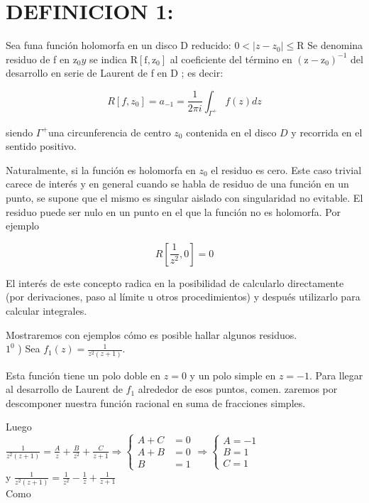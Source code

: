 \documentclass[10pt]{article}
\theoremstyle{plain}
\theoremstyle{definition}
\theoremstyle{remark}
\begin{document}
\section*{DEFINICION 1:}
Sea funa función holomorfa en un disco D reducido: $0<\left|z-z_{0}\right| \leqslant \mathrm{R}$ Se denomina residuo de f en $\mathrm{z}_0 y$ se indica $\mathrm{R}\left[\mathrm{f}, \mathrm{z}_0\right]$ al coeficiente del término en $\left(\mathrm{z}-\mathrm{z}_0\right)^{-1}$ del desarrollo en serie de Laurent de f en D ; es decir:


\begin{equation*}
R\left[f, z_{0}\right]=a_{-1}=\frac{1}{2 \pi i} \int_{\Gamma^{+}} f(z) d z \tag{20-1}
\end{equation*}


siendo $\Gamma^{+}$una circunferencia de centro $z_{0}$ contenida en el disco $D$ y recorrida en el sentido positivo.

Naturalmente, si la función es holomorfa en $z_{0}$ el residuo es cero. Este caso trivial carece de interés y en general cuando se habla de residuo de una función en un punto, se supone que el mismo es singular aislado con singularidad no evitable. El residuo puede ser nulo en un punto en el que la función no es holomorfa. Por ejemplo

$$
R\left[\frac{1}{z^{2}}, 0\right]=0
$$

El interés de este concepto radica en la posibilidad de calcularlo directamente (por derivaciones, paso al límite u otros procedimientos) y después utilizarlo para calcular integrales.

Mostraremos con ejemplos cómo es posible hallar algunos residuos.\\
$1^{0}$ ) Sea $f_{1}(z)=\frac{1}{z^{2}(z+1)}$.

Esta función tiene un polo doble en $z=0$ y un polo simple en $z=-1$. Para llegar al desarrollo de Laurent de $f_{1}$ alrededor de esos puntos, comen. zaremos por descomponer nuestra función racional en suma de fracciones simples.

Luego\\
$\frac{1}{z^{2}(z+1)}=\frac{A}{z}+\frac{B}{z^{2}}+\frac{C}{z+1} \Longrightarrow\left\{\begin{aligned} A+C & =0 \\ A+B & =0 \\ B & =1\end{aligned} \Longrightarrow\left\{\begin{array}{c}A=-1 \\ B=1 \\ C=1\end{array}\right.\right.$\\
y $\frac{1}{z^{2}(z+1)}=\frac{1}{z^{2}}-\frac{1}{z}+\frac{1}{z+1}$\\
Como
\end{document}
